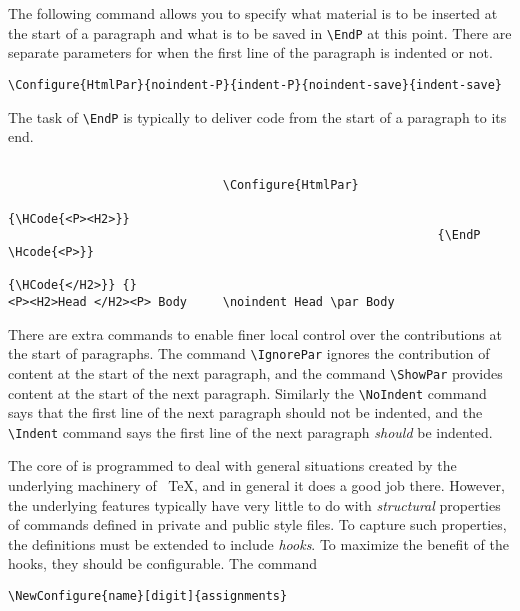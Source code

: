 
The following command allows you to specify what material is to be inserted at 
the start of a paragraph and what is to be saved in \verb|\EndP| at this point. There are 
separate parameters for when the first line of the paragraph is indented or not. 

\begin{lstlisting}
\Configure{HtmlPar}{noindent-P}{indent-P}{noindent-save}{indent-save} 
\end{lstlisting}

The task of \verb|\EndP| is typically to deliver code from the start of a paragraph to its 
end. 

\begin{verbatim}

                              \Configure{HtmlPar} 
														    {\HCode{<P><H2>}} 
														    {\EndP \Hcode{<P>}} 
														    {\HCode{</H2>}} {} 
<P><H2>Head </H2><P> Body     \noindent Head \par Body 

\end{verbatim}

There are extra commands to enable finer local control over the contributions 
at the start of paragraphs. The command \verb|\IgnorePar| ignores the contribution of 
content at the start of the next paragraph, and the command \verb|\ShowPar| provides 
content at the start of the next paragraph. Similarly the \verb|\NoIndent| command says 
that the first line of the next paragraph should not be indented, and the \verb|\Indent| 
command says the first line of the next paragraph \emph{should} be indented. 
 
 

The core of \texht is programmed to deal with general situations created
by the underlying machinery of \ \TeX, and in general it does a good job
there. However, the underlying features typically have very little to do
with \emph{structural} properties of commands defined in private and
public style files. To capture such properties, the definitions must be
extended to include \emph{hooks}. To maximize the benefit of the hooks,
they should be configurable. The command 

\begin{lstlisting}
\NewConfigure{name}[digit]{assignments} 
\end{lstlisting}

